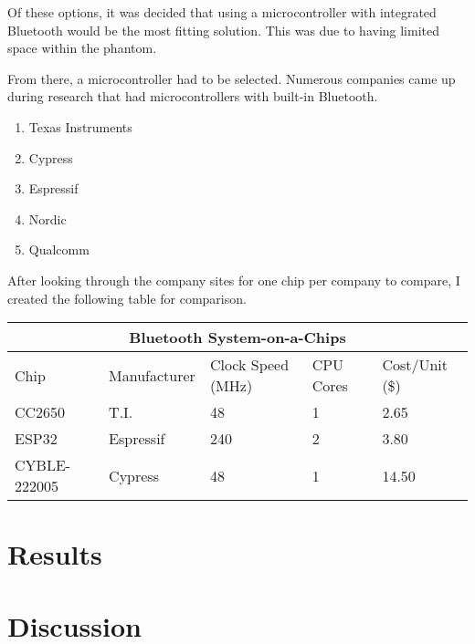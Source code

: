 \documentclass[12pt, titlepage]{article}
\begin{document}
Of these options, it was decided that using a microcontroller with integrated Bluetooth would be the most fitting solution. This was due to having limited space within the phantom.

From there, a microcontroller had to be selected. Numerous companies came up during research that had microcontrollers with built-in Bluetooth. 

\begin{enumerate}
    \item Texas Instruments
    \item Cypress
    \item Espressif
    \item Nordic
    \item Qualcomm
\end{enumerate}

After looking through the company sites for one chip per company to compare, I created the following table for comparison.

\begin{tabular}{ |p{3cm}||p{3cm}|p{3cm}|p{3cm}|p{3cm}|  }
    \hline
    \multicolumn{5}{|c|}{Bluetooth System-on-a-Chips} \\
    \hline
    Chip & Manufacturer & Clock Speed (MHz) & CPU Cores & Cost/Unit (\$)\\
    \hline
    CC2650 \cite{cc2650} & T.I.      & 48  & 1 & 2.65 \\
    ESP32  \cite{esp32}  & Espressif & 240 & 2 & 3.80 \\
    CYBLE-222005 \cite{cyble} & Cypress & 48 & 1 & 14.50 \\
    \hline
\end{tabular}

\section{Results}


\section{Discussion}

\clearpage


\end{document}
